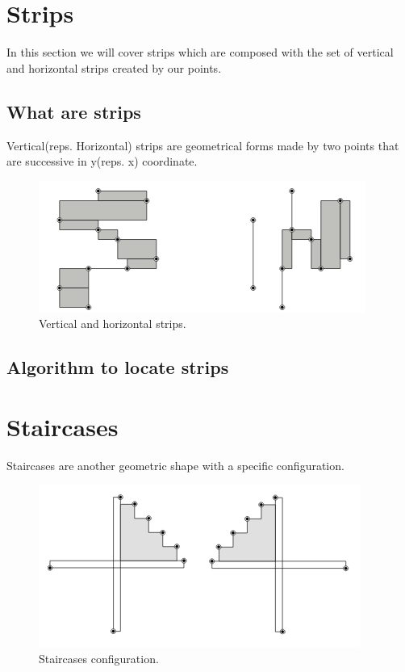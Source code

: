 

\section{Strips}%
In this section we will cover strips which are composed with the set of vertical and horizontal strips created by our points.
\subsection{What are strips}
Vertical(reps. Horizontal) strips are geometrical forms made by two points that are successive in y(reps. x) coordinate.
\begin{figure}[H]
  \includegraphics[width=\linewidth]{img/strips.png}
  \caption{Vertical and horizontal strips.}
  \label{fig:strips}
\end{figure}
\subsection{Algorithm to locate strips}


\section{Staircases}%
Staircases are another geometric shape with a specific configuration.
\begin{figure}[H]
  \includegraphics[width=\linewidth]{img/staircases.png}
  \caption{Staircases configuration.}
  \label{fig:staircases} 
\end{figure}

